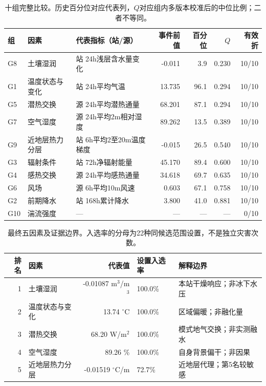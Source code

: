 \begin{table}[H]\centering\scriptsize
\caption{十组完整比较。历史百分位对应代表列，$Q$对应组内多版本校准后的中位比例；二者不等同。}
\begin{tabularx}{\linewidth}{llXrrrr}\toprule 组 & 因素 & 代表指标（站/源） & 事件前值 & 百分位 & $Q$ & 有效折\\\midrule
G8 & 土壤湿润 & 站 24h浅层含水量变化 & -0.011 & 3.9 & 0.230 & 10/10 \\
G1 & 温度状态与变化 & 站 24h平均气温 & 13.735 & 96.1 & 0.294 & 10/10 \\
G5 & 潜热交换 & 源 24h平均潜热通量 & 68.201 & 87.1 & 0.294 & 10/10 \\
G7 & 空气湿度 & 源 24h平均2m相对湿度 & 89.262 & 13.5 & 0.389 & 10/10 \\
G9 & 近地层热力分层 & 站 6h平均2至20m温度梯度 & -0.015 & 26.5 & 0.540 & 10/10 \\
G3 & 辐射条件 & 站 72h净辐射能量 & 45.170 & 89.4 & 0.600 & 10/10 \\
G4 & 感热交换 & 源 24h平均感热通量 & 34.618 & 69.7 & 0.635 & 10/10 \\
G6 & 风场 & 源 6h平均10m风速 & 0.603 & 67.1 & 0.758 & 10/10 \\
G2 & 前期降水 & 站 168h累计降水 & 3.800 & 41.0 & 0.881 & 10/10 \\
G10 & 湍流强度 & — & — & — & — & 0/10 \\
\bottomrule\end{tabularx}\end{table}

\begin{table}[H]\centering\scriptsize
\caption{最终五因素及证据边界。入选率的分母为22种同候选范围设置，不是独立灾害次数。}
\begin{tabularx}{\linewidth}{rlrlX}\toprule 排名 & 因素 & 代表值 & 设置入选率 & 解释边界\\\midrule
1 & 土壤湿润 & -0.01087 m$^3$/m$^3$ & 100.0\% & 本站干燥响应；非冰下水压 \\
2 & 温度状态与变化 & 13.74 $^\circ$C & 100.0\% & 区域偏暖；非融化量 \\
3 & 潜热交换 & 68.20 W/m$^2$ & 100.0\% & 模式地气交换；非实测融水 \\
4 & 空气湿度 & 89.26 \% & 100.0\% & 自身背景偏干；非因果 \\
5 & 近地层热力分层 & -0.01519 $^\circ$C/m & 72.7\% & 近地层代理；第5名较敏感 \\
\bottomrule\end{tabularx}\end{table}

